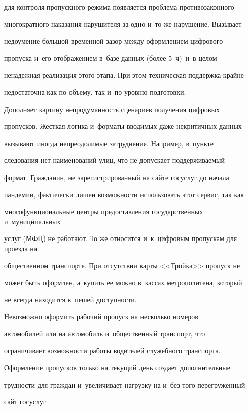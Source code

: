 для контроля пропускного режима появляется проблема противозаконного 


многократного наказания нарушителя за одно и~то же нарушение. Вызывает 


недоумение большой временной зазор между оформлением цифрового 


пропуска и~его отображением в~базе данных (более 5~ч)\ и~в целом 


ненадежная реализация этого этапа. При этом техническая поддержка крайне 


недостаточна как по объему, так и~по уровню подготовки. 


   


   Дополняет картину непродуманность сценариев получения цифровых 


пропусков. Жесткая логика и~форматы вводимых даже некритичных данных 


вызывают иногда непреодолимые затруднения. Например, в~пункте 


следования нет наименований улиц, что не допускает поддерживаемый 


формат. Гражданин, не зарегистрированный на сайте госуслуг до начала 


пандемии, фактически лишен возможности использовать этот сервис, так как 


многофункциональные центры предоставления государственных и~муниципальных


услуг (МФЦ) не работают. То же относится и~к~цифровым пропускам для проезда на 


общественном транспорте. При отсутствии карты <<Тройка>> пропуск не 


может быть оформлен, а~купить ее можно в~кассах метрополитена, который 


не всегда находится в~пешей доступности. 


   


   Невозможно оформить рабочий пропуск на несколько номеров 


автомобилей или на автомобиль и~общественный транспорт, что 


ограничивает возможности работы водителей служебного транспорта. 


Оформление пропусков только на текущий день создает дополнительные 


трудности для граждан и~увеличивает нагрузку на и~без того перегруженный 


сайт госуслуг.


